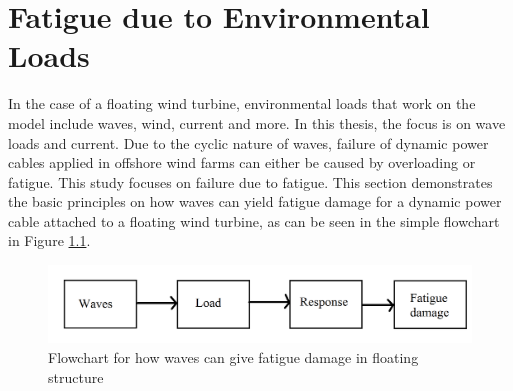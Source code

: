 \chapter{Fatigue due to Environmental Loads}
\label{chap:fatigue}
In the case of a floating wind turbine, environmental loads that work on the model include waves, wind, current and more. In this thesis, the focus is on wave loads and current. Due to the cyclic nature of waves, failure of dynamic power cables applied in offshore wind farms can either be caused by overloading or fatigue.  This study focuses on failure due to fatigue. This section demonstrates the basic principles on how waves can yield fatigue damage for a dynamic power cable attached to a floating wind turbine, as can be seen in the simple flowchart in Figure \ref{fig:flowchart}. 

\begin{figure}[h!]
\centering
\includegraphics[scale=0.75]{figures/box}
\caption[$\; \:$Flowchart]{Flowchart for how waves can give fatigue damage in floating structure}
 \label{fig:flowchart}
\end{figure}

